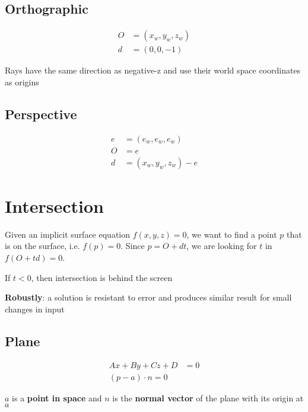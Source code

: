   \subsection{Orthographic}

    \begin{align}
      O &= \left( x_{w}, y_{w}, z_{w} \right) \\
      d &= \left( 0, 0, -1 \right)
    \end{align}

    Rays have the same direction as negative-z and use their world space
    coordinates as origins

  \subsection{Perspective}

    \begin{align}
      e &= \left( e_{w}, e_{w}, e_{w} \right) \\
      O &= e  \\
      d &= \left( x_{w}, y_{w}, z_{w} \right) - e
    \end{align}

\section{Intersection}

  Given an implicit surface equation $ f\left( x, y, z \right) = 0 $, we
  want to find a point $ p $ that is on the surface,
  i.e. $ f\left( p \right) = 0 $. Since $ p = O + dt $, we are looking for
  $ t $ in $ f\left( O + td \right) = 0 $.

  If $ t < 0 $, then intersection is behind the screen

  \textbf{Robustly}: a solution is resistant to error and produces similar
  result for small changes in input

  \subsection{Plane}

    \begin{align}
      Ax + By + Cz + D &= 0 \\
      \left( p - a \right) \cdot n = 0
    \end{align}

    $ a $ is a \textbf{point in space} and $ n $ is the \textbf{normal vector}
    of the plane with its origin at $ a $

